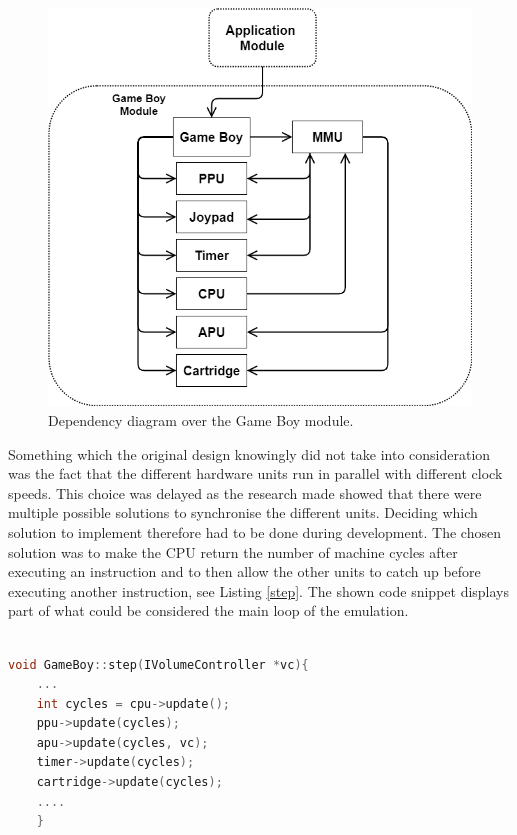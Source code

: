 \begin{figure}[H]
    \centering
    \includegraphics[scale=0.40]{figures/Game Boy Dependencies2.png}
    \caption{Dependency diagram over the Game Boy module.}
    \label{fig:dependency_diagram}
\end{figure}

Something which the original design knowingly did not take into consideration was the fact that the different hardware units run in parallel with different clock speeds. This choice was delayed as the research made showed that there were multiple possible solutions to synchronise the different units. Deciding which solution to implement therefore had to be done during development. The chosen solution was to make the CPU return the number of machine cycles after executing an instruction and to then allow the other units to catch up before executing another instruction, see Listing \ref{step}. The shown code snippet displays part of what could be considered the main loop of the emulation.
\\\\
\begin{lstlisting}[language=C++,
caption = {Code displaying how the CPU executes an instruction and returns the number of machine cycles, whereafter the other units catch up by executing the same number of cycles.},
label = {step}]
void GameBoy::step(IVolumeController *vc){
    ...
    int cycles = cpu->update();
    ppu->update(cycles);
    apu->update(cycles, vc);
    timer->update(cycles);
    cartridge->update(cycles);
    ....
    }
\end{lstlisting}
\newpage
